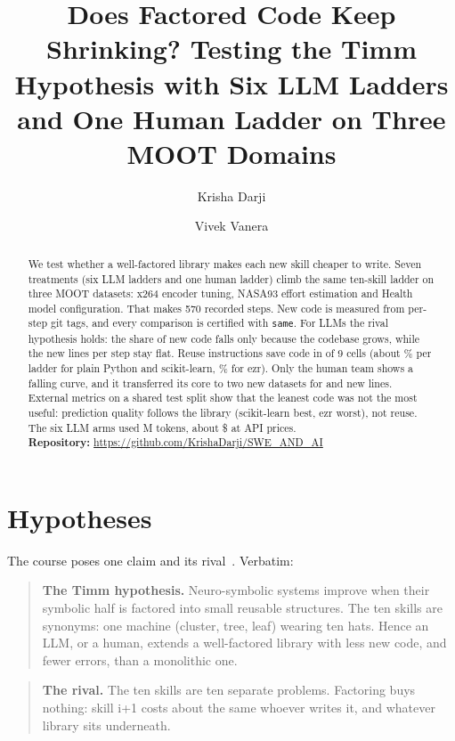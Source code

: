 \documentclass[acmsmall,nonacm]{acmart}
\newcommand{\repo}{\url{https://github.com/KrishaDarji/SWE_AND_AI}}
\newcommand{\same}{\texttt{same}}
\begin{document}
\title{Does Factored Code Keep Shrinking? Testing the Timm Hypothesis with Six LLM Ladders and One Human Ladder on Three MOOT Domains}

\author{Krisha Darji}
\author{Vivek Vanera}

\begin{abstract}
We test whether a well-factored library makes each new skill cheaper to write. Seven treatments (six LLM ladders and one human ladder) climb the same ten-skill ladder on three MOOT datasets: x264 encoder tuning, NASA93 effort estimation and Health model configuration. That makes 570 recorded steps. New code is measured from per-step git tags, and every comparison is certified with \same. For LLMs the rival hypothesis holds: the share of new code falls only because the codebase grows, while the new lines per step stay flat. Reuse instructions save code in \reuseCertified{} of 9 cells (about \savePython\% per ladder for plain Python and scikit-learn, \saveezr\% for ezr). Only the human team shows a falling curve, and it transferred its core to two new datasets for \tSevenNasa{} and \tSevenHealth{} new lines. External metrics on a shared test split show that the leanest code was not the most useful: prediction quality follows the library (scikit-learn best, ezr worst), not reuse. The six LLM arms used \tokensRuns M tokens, about \$\costRuns{} at API prices.\\[2pt]
\textbf{Repository:} \repo
\end{abstract}

\maketitle

\section{Hypotheses}

The course poses one claim and its rival~\cite{seai26f}. Verbatim:

\begin{quote}
\textbf{The Timm hypothesis.} Neuro-symbolic systems improve when their symbolic half is factored into small reusable structures. The ten skills are synonyms: one machine (cluster, tree, leaf) wearing ten hats. Hence an LLM, or a human, extends a well-factored library with less new code, and fewer errors, than a monolithic one.
\end{quote}
\begin{quote}
\textbf{The rival.} The ten skills are ten separate problems. Factoring buys nothing: skill i+1 costs about the same whoever writes it, and whatever library sits underneath.
\end{quote}
\end{document}
